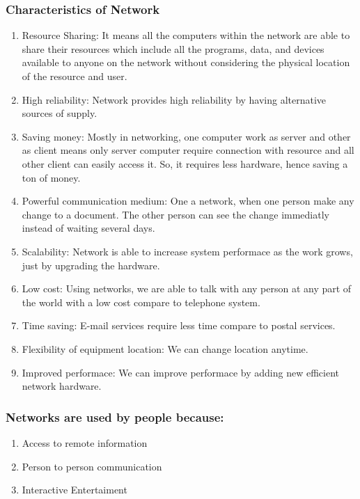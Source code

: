 \documentclass[11pt]{article}
\begin{document}
\subsubsection{Characteristics of Network}
\label{sec:org828f9b7}
\begin{enumerate}
\item Resource Sharing:
\label{sec:org8fc229c}
It means all the computers within the network are able to share their resources which include
all the programs, data, and devices available to anyone on the network without considering the
physical location of the resource and user.
\item High reliability:
\label{sec:orge58ea6c}
Network provides high reliability by having alternative sources of supply.
\item Saving money:
\label{sec:org29350d5}
Mostly in networking, one computer work as server and other as client means only server computer
require connection with resource and all other client can easily access it. So, it requires less
hardware, hence saving a ton of money.
\item Powerful communication medium:
\label{sec:orgb0a1e63}
One a network, when one person make any change to a document. The other person can see the change
immediatly instead of waiting several days.
\item Scalability:
\label{sec:org7280526}
Network is able to increase system performace as the work grows, just by upgrading the hardware.
\item Low cost:
\label{sec:org58245c8}
Using networks, we are able to talk with any person at any part of the world with a low cost
compare to telephone system.
\item Time saving:
\label{sec:org3d69505}
E-mail services require less time compare to postal services.
\item Flexibility of equipment location:
\label{sec:org9257518}
We can change location anytime.
\item Improved performace:
\label{sec:orgedfec3a}
We can improve performace by adding new efficient network hardware.
\end{enumerate}
\subsubsection{Networks are used by people because:}
\label{sec:org1d02990}
\begin{enumerate}
\item Access to remote information
\label{sec:orgf2f06b6}
\item Person to person communication
\label{sec:org1fe11d5}
\item Interactive Entertaiment
\label{sec:org5433d2c}
\end{enumerate}
\end{document}
